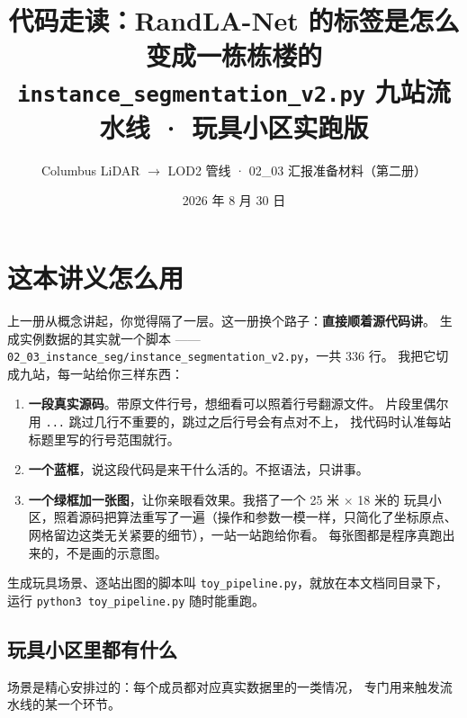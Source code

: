 \documentclass[11pt]{ctexart}
\title{\textbf{代码走读：RandLA-Net 的标签是怎么变成一栋栋楼的}\\[0.3em]
\Large \texttt{instance\_segmentation\_v2.py} 九站流水线 · 玩具小区实跑版}
\author{Columbus LiDAR $\to$ LOD2 管线 · 02\_03 汇报准备材料（第二册）}
\date{2026 年 8 月 30 日}
\begin{document}
\maketitle

\section*{这本讲义怎么用}

上一册从概念讲起，你觉得隔了一层。这一册换个路子：\textbf{直接顺着源代码讲}。
生成实例数据的其实就一个脚本
——\texttt{02\_03\_instance\_seg/instance\_segmentation\_v2.py}，一共 336 行。
我把它切成九站，每一站给你三样东西：

\begin{enumerate}
\item \textbf{一段真实源码}。带原文件行号，想细看可以照着行号翻源文件。
      片段里偶尔用 \texttt{...} 跳过几行不重要的，跳过之后行号会有点对不上，
      找代码时认准每站标题里写的行号范围就行。
\item \textbf{一个蓝框}，说这段代码是来干什么活的。不抠语法，只讲事。
\item \textbf{一个绿框加一张图}，让你亲眼看效果。我搭了一个 25 米 $\times$ 18 米的
      玩具小区，照着源码把算法重写了一遍（操作和参数一模一样，只简化了坐标原点、
      网格留边这类无关紧要的细节），一站一站跑给你看。
      每张图都是程序真跑出来的，不是画的示意图。
\end{enumerate}

生成玩具场景、逐站出图的脚本叫 \texttt{toy\_pipeline.py}，就放在本文档同目录下，
运行 \texttt{python3 toy\_pipeline.py} 随时能重跑。

\subsection*{玩具小区里都有什么}

场景是精心安排过的：每个成员都对应真实数据里的一类情况，
专门用来触发流水线的某一个环节。
\end{document}
